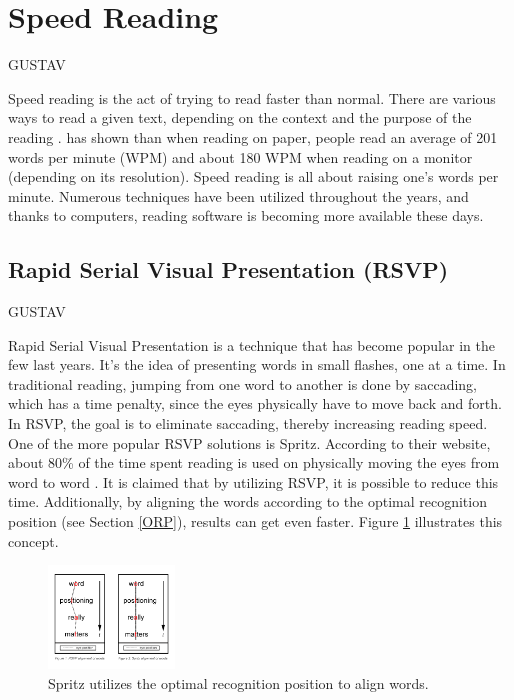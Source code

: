 \section{Speed Reading}
GUSTAV

Speed reading is the act of trying to read faster than normal. There are various ways to read a given text, depending on the context and the purpose of the reading \cite{differentWaysOfReading}. \cite{ziefle_effects_1998} has shown than when reading on paper, people read an average of 201 words per minute (WPM) and about 180 WPM when reading on a monitor (depending on its resolution). Speed reading is all about raising one's words per minute. Numerous techniques have been utilized throughout the years, and  thanks to computers, reading software is becoming more available these days.


\subsection{Rapid Serial Visual Presentation (RSVP)}
GUSTAV

Rapid Serial Visual Presentation is a technique that has become popular in the few last years. It's the idea of presenting words in small flashes, one at a time. In traditional reading, jumping from one word to another is done by saccading, which has a time penalty, since the eyes physically have to move back and forth. In RSVP, the goal is to eliminate saccading, thereby increasing reading speed. One of the more popular RSVP solutions is Spritz. According to their website, about 80\% of the time spent reading is used on physically moving the eyes from word to word \cite{spritz}.	It is claimed that by utilizing RSVP, it is possible to reduce this time. Additionally, by aligning the words according to the optimal recognition position (see Section \ref{ORP}), results can get even faster. Figure \ref{fig:spritz_orp} illustrates this concept.

\begin{figure}[htbp]
\centering
\includegraphics[width=0.3\textwidth]{Pics/opr_spritz}
\caption{Spritz utilizes the optimal recognition position to align words.}
\label{fig:spritz_orp}
\end{figure}

